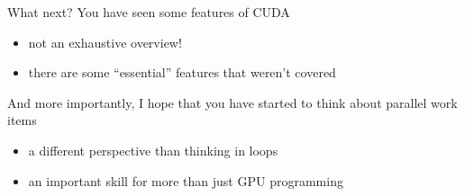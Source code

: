 \begin{frame}[fragile]{}
    \begin{info}{What next?}
        You have seen some features of CUDA
        \begin{itemize}
            \item not an exhaustive overview!
            \item there are some ``essential'' features that weren't covered
        \end{itemize}
        And more importantly, I hope that you have started to think about parallel work items
        \begin{itemize}
            \item a different perspective than thinking in loops
            \item an important skill for more than just GPU programming
        \end{itemize}
    \end{info}

\end{frame}

